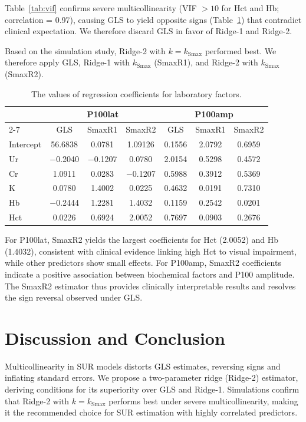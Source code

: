\documentclass[twoside]{article}
\begin{document}
Table~\ref{tab:vif} confirms severe multicollinearity (VIF $> 10$ for Hct and Hb; correlation = 0.97), causing GLS to yield opposite signs (Table~\ref{tab:coef}) that contradict clinical expectation. We therefore discard GLS in favor of Ridge-1 and Ridge-2.

Based on the simulation study, Ridge-2 with $k = k_{\text{Smax}}$ performed best. We therefore apply GLS, Ridge-1 with $k_{\text{Smax}}$ (SmaxR1), and Ridge-2 with $k_{\text{Smax}}$ (SmaxR2).

\begin{table}[htbp]
\centering
\caption{The values of regression coefficients for laboratory factors.}
\label{tab:coef}
\begin{tabular}{|l|ccc|ccc|}
\hline
& \multicolumn{3}{c|}{P100lat} & \multicolumn{3}{c|}{P100amp} \\
\cline{2-7}
& GLS & SmaxR1 & SmaxR2 & GLS & SmaxR1 & SmaxR2 \\
\hline
Intercept & 56.6838 & 0.0781 & 1.09126 & 0.1556 & 2.0792 & 0.6959 \\
Ur & $-$0.2040 & $-$0.1207 & 0.0780 & 2.0154 & 0.5298 & 0.4572 \\
Cr & 1.0911 & 0.0283 & $-$0.1207 & 0.5988 & 0.3912 & 0.5369 \\
K & 0.0780 & 1.4002 & 0.0225 & 0.4632 & 0.0191 & 0.7310 \\
Hb & $-$0.2444 & 1.2281 & 1.4032 & 0.1159 & 0.2542 & 0.0201 \\
Hct & 0.0226 & 0.6924 & 2.0052 & 0.7697 & 0.0903 & 0.2676 \\
\hline
\end{tabular}
\end{table}

For P100lat, SmaxR2 yields the largest coefficients for Hct (2.0052) and Hb (1.4032), consistent with clinical evidence linking high Hct to visual impairment, while other predictors show small effects. For P100amp, SmaxR2 coefficients indicate a positive association between biochemical factors and P100 amplitude. The SmaxR2 estimator thus provides clinically interpretable results and resolves the sign reversal observed under GLS.

\section*{Discussion and Conclusion}   
Multicollinearity in SUR models distorts GLS estimates, reversing signs and inflating standard errors. We propose a two-parameter ridge (Ridge-2) estimator, deriving conditions for its superiority over GLS and Ridge-1. Simulations confirm that Ridge-2 with $k = k_{\text{Smax}}$ performs best under severe multicollinearity, making it the recommended choice for SUR estimation with highly correlated predictors.
\end{document}
